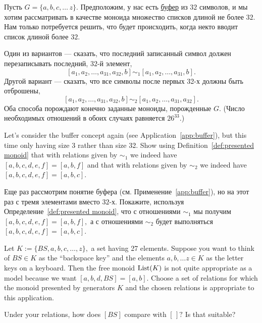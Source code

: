 \documentclass[CT4S-EN-RU]{subfiles}
\begin{document}
\begin{applicationRUS}[Буфер]\label{app:buffer}
Пусть $G=\{a,b,c,\ldots\,z\}.$ Предположим, у нас есть \href{https://ru.wikipedia.org/wiki/%D0%91%D1%83%D1%84%D0%B5%D1%80_(%D0%B8%D0%BD%D1%84%D0%BE%D1%80%D0%BC%D0%B0%D1%82%D0%B8%D0%BA%D0%B0)}{\text буфер} из $32$ символов, и мы хотим рассматривать в качестве моноида множество списков длиной не более $32.$ Нам только потребуется решить, что будет происходить, когда некто вводит список длиной более $32$.

Один из вариантов — сказать, что последний записанный символ должен перезаписывать последний, $32$-й элемент, $$[a_1,a_2,\ldots,a_{31},a_{32},b]\sim_1[a_1,a_2,\ldots,a_{31},b].$$ Другой вариант — сказать, что все символы после первых 32-х должны быть отброшены, $$[a_1,a_2,\ldots,a_{31},a_{32},b]\sim_2[a_1,a_2,\ldots,a_{31},a_{32}].$$ Оба способа порождают конечно заданные моноиды, порожденные $G.$ (Число необходимых отношений в обоих случаях равняется $26^{33}.$)
\end{applicationRUS}

\begin{exerciseENG}\label{exc:buffer3}
Let's consider the buffer concept again (see Application~\ref{app:buffer}), but this time only having size 3 rather than size 32. Show using Definition~\ref{def:presented monoid} that with relations given by $\sim_1$ we indeed have $[a,b,c,d,e,f]=[a,b,f]$ and that with relations given by $\sim_2$ we indeed have $[a,b,c,d,e,f]=[a,b,c].$
\end{exerciseENG}

\begin{exerciseRUS}\label{exc:buffer3}
Еще раз рассмотрим понятие буфера (см. Применение~\ref{app:buffer}), но на этот раз с тремя элементами вместо $32$-х. Покажите, используя Определение~\ref{def:presented monoid}, что с отношениями $\sim_1$ мы получим $[a,b,c,d,e,f]=[a,b,f],$ а с отношениями $\sim_2$ будет выполняться $[a,b,c,d,e,f]=[a,b,c].$
\end{exerciseRUS}

\begin{exerciseENG}
Let $K:=\{BS,a,b,c,\ldots,z\},$ a set having 27 elements. Suppose you want to think of $BS\in K$ as the “backspace key” and the elements $a,b,\ldots z\in K$ as the letter keys on a keyboard. Then the free monoid $\operatorname{List}(K)$ is not quite appropriate as a model because we want $[a,b,d,BS]=[a,b].$
\sexc Choose a set of relations for which the monoid presented by generators $K$ and the chosen relations is appropriate to this application.
\item Under your relations, how does $[BS]$ compare with $[\,]?$ Is that suitable?
\endsexc
\end{exerciseENG}
\end{document}
